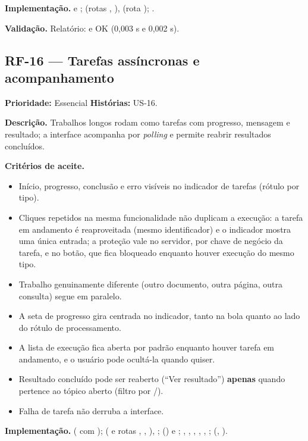\textbf{Implementação.}  e ;  (rotas \texttt{}, \texttt{}),  (rota \texttt{}); .

\textbf{Validação.} Relatório: \texttt{} e \texttt{} OK (0,003 s e 0,002 s).

\subsection{RF-16 --- Tarefas assíncronas e acompanhamento}

\textbf{Prioridade:} Essencial \quad \textbf{Histórias:} US-16.

\textbf{Descrição.} Trabalhos longos rodam como tarefas com progresso, mensagem e resultado; a interface acompanha por \emph{polling} e permite reabrir resultados concluídos.

\textbf{Critérios de aceite.}
\begin{itemize}
    \item Início, progresso, conclusão e erro visíveis no indicador de tarefas (rótulo por tipo).
    \item Cliques repetidos na mesma funcionalidade não duplicam a execução: a tarefa em andamento é reaproveitada (mesmo identificador) e o indicador mostra uma única entrada; a proteção vale no servidor, por chave de negócio da tarefa, e no botão, que fica bloqueado enquanto houver execução do mesmo tipo.
    \item Trabalho genuinamente diferente (outro documento, outra página, outra consulta) segue em paralelo.
    \item A seta de progresso gira centrada no indicador, tanto na bola quanto ao lado do rótulo de processamento.
    \item A lista de execução fica aberta por padrão enquanto houver tarefa em andamento, e o usuário pode ocultá-la quando quiser.
    \item Resultado concluído pode ser reaberto (``Ver resultado'') \textbf{apenas} quando pertence ao tópico aberto (filtro por \texttt{}/\texttt{}).
    \item Falha de tarefa não derruba a interface.
\end{itemize}

\textbf{Implementação.}  (\texttt{} com \texttt{});  (\texttt{} e rotas \texttt{}, \texttt{}, \texttt{}), ;  (\texttt{}) e ; , , , , , ;  (\texttt{}, \texttt{}).

